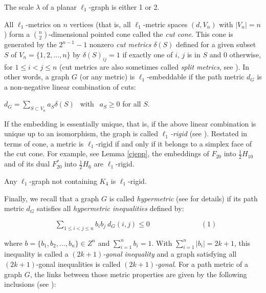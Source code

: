 \begin{lemma}\cite{cdg96}
The scale $\lambda$ of a planar $\ell_1$-graph is either 1 or 2.
\end{lemma}

All $\ell_1$-metrics on $n$ vertices (that is, all $\ell_1$-metric spaces $(d,V_n)$ with $|V_n|=n$) form
a $n\choose 2$-dimensional pointed cone called the {\em cut cone}. This cone is generated
by the $2^{n-1}-1$ nonzero {\em cut metrics} $\delta(S)$ defined  for a given subset $S$ of $V_n=\{1,2,\dots,n\}$ by
$\delta(S)_{ij}=1$ if exactly one of $i$, $j$ is in $S$ and $0$ otherwise, 
for $1\leq i<j\leq n$ (cut metrics are also sometimes called {\it split metrics},
see \cite{ddres}).
In other words, a graph $G$ (or any metric) is $\ell_1$-embeddable if  the path metric $d_G$ is a non-negative
linear combination of cuts:
\begin{center}
${\displaystyle d_G=\sum_{S\subset V_n} a_S\delta(S)}\:\:$ with $\:\:a_S\geq 0$ for all $S$.
\end{center}
If the embedding is essentially unique, that is, if the above linear combination is unique up to
an isomorphism,
the graph is called {\em $\ell_1$-rigid} (see \cite{dl94}). Restated in terms of cone, a metric is $\ell_1$-rigid
if and only if it belongs to a simplex face of the cut cone. For example, see Lemma \ref{cjepp}, 
the embeddings of $F_{20}$ into
$\frac{1}{2}H_{10}$ and of its dual $F^*_{20}$ into $\frac{1}{2}H_{6}$ are $\ell_1$-rigid.

\begin{lemma}\label{DeCh} \cite{cdg96}
Any $\ell_1$-graph not containing $K_4$ is $\ell_1$-rigid.
\end{lemma}

Finally, we recall that a graph $G$ is called {\em hypermetric} (see \cite{dl96}
for details) if
its path metric $d_G$ satisfies all {\em hypermetric inequalities} defined by:

\begin{center}
$ \hspace{3cm} 
{\displaystyle \sum_{1\leq i<j\leq n}b_i b_j \: d_G(i,j)\leq 0} 
\hspace{3cm} (1)$
\end{center}
where $b=\{b_1,b_2,\dots,b_n\}\in Z^n$ and ${\displaystyle \sum_{i=1}^n b_i=1}$.
With ${\displaystyle \sum_{i=1}^n |b_i|=2k+1}$, this inequality is called  a
{\em $(2k+1)$-gonal inequality} and a graph satisfying all $(2k+1)$-gonal 
inequalities is called {\em $(2k+1)$-gonal}.
For a path metric of a graph $G$, the links between those metric properties
are given by the following inclusions (see \cite{dl96}): 

